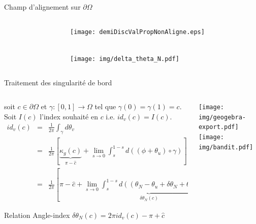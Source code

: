\begin{frame}{Champ d'alignement sur $\partial\Omega$}
\begin{columns}
\begin{column}{0.7\textwidth}
    \end{column}
    \begin{column}{0.3\textwidth}
        \centering
        \texttt{[image: demiDiscValPropNonAligne.eps]}
        \caption{\footnotesize Champ de croix "input"}\\\vspace{0.5cm}
        \texttt{[image: img/delta\_theta\_N.pdf]}
    \end{column}
    \end{columns}
\end{frame}

\begin{frame}{Traitement des singularité de bord}{}
\vspace{-0.2cm}
\\
\vspace{0.1cm}
\begin{columns}
\begin{column}{0.55\textwidth}
\small
soit $c\in\partial\Omega$ et $\gamma:[0,1]\rightarrow\Omega$ tel que $\gamma(0)=\gamma(1)=c$. Soit $I(c)$ l'index souhaité en $c$ i.e. $id_v(c)=I(c)$.
\vspace{-0.25cm}
    \begin{eqnarray*}
    id_v(c)&=&\frac{1}{2\pi}\int_\gamma d\theta_v\\
    &=&\frac{1}{2\pi}[\underbrace{\kappa_g(c)}_{\pi-\hat{c}}+\lim\limits_{s\rightarrow 0}\int_s^{1-s}d((\phi+\theta_u)\circ\gamma)]\\
    &=&\frac{1}{2\pi}[\pi-\hat{c}+\underbrace{\lim\limits_{s\rightarrow 0}\int_s^{1-s}d((\theta_N-\theta_u+\delta\theta_N+\theta_u)\circ\gamma)}_{\delta\theta_N(c)}]
    \end{eqnarray*}
    \vspace{-0.8cm}

\begin{onerablock}{\footnotesize Relation Angle-index}
\centering
$
\delta\theta_N(c) = 2\pi id_v(c)-\pi+\hat{c}
$
\end{onerablock}
\end{column}
\begin{column}{0.45\textwidth}
\centering
\texttt{[image: img/geogebra-export.pdf]}\\\vspace{0.2cm}
\texttt{[image: img/bandit.pdf]}
\end{column}
\end{columns}
\end{frame}

